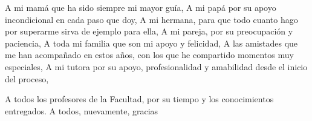 \begin{acknowledgements}
      A mi mamá que ha sido siempre mi mayor guía,
    A mi papá por su apoyo incondicional en cada paso que doy,
    A mi hermana, para que todo cuanto hago por superarme sirva de 
    ejemplo para ella,
    A mi pareja, por su preocupación y paciencia,
    A toda mi familia que son mi apoyo y felicidad,
    A las amistades que me han acompañado en estos años, con los que he 
    compartido momentos muy especiales,
    A mi tutora por su apoyo, profesionalidad y amabilidad desde el inicio 
    del proceso,
   
    A todos los profesores de la Facultad, por su tiempo y los 
    conocimientos entregados.
    A todos, nuevamente, gracias
\end{acknowledgements}